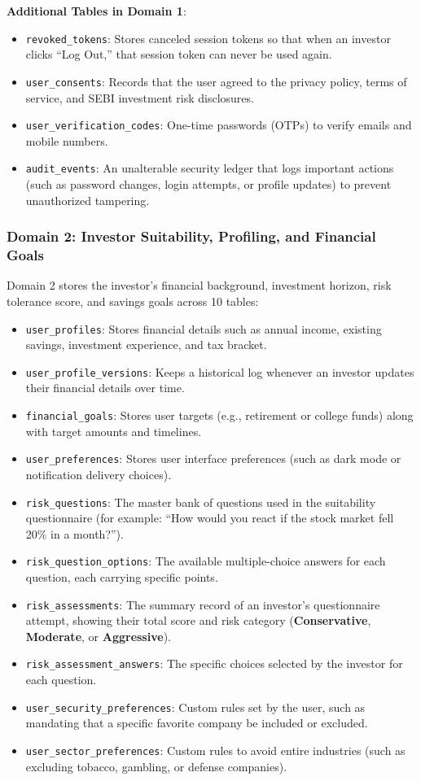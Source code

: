 \noindent \textbf{Additional Tables in Domain 1}:
\begin{itemize}
    \item \texttt{revoked\_tokens}: Stores canceled session tokens so that when an investor clicks ``Log Out,'' that session token can never be used again.
    \item \texttt{user\_consents}: Records that the user agreed to the privacy policy, terms of service, and SEBI investment risk disclosures.
    \item \texttt{user\_verification\_codes}: One-time passwords (OTPs) to verify emails and mobile numbers.
    \item \texttt{audit\_events}: An unalterable security ledger that logs important actions (such as password changes, login attempts, or profile updates) to prevent unauthorized tampering.
\end{itemize}

\clearpage
\subsubsection{Domain 2: Investor Suitability, Profiling, and Financial Goals}
Domain 2 stores the investor's financial background, investment horizon, risk tolerance score, and savings goals across 10 tables:
\begin{itemize}
    \item \texttt{user\_profiles}: Stores financial details such as annual income, existing savings, investment experience, and tax bracket.
    \item \texttt{user\_profile\_versions}: Keeps a historical log whenever an investor updates their financial details over time.
    \item \texttt{financial\_goals}: Stores user targets (e.g., retirement or college funds) along with target amounts and timelines.
    \item \texttt{user\_preferences}: Stores user interface preferences (such as dark mode or notification delivery choices).
    \item \texttt{risk\_questions}: The master bank of questions used in the suitability questionnaire (for example: ``How would you react if the stock market fell 20\% in a month?'').
    \item \texttt{risk\_question\_options}: The available multiple-choice answers for each question, each carrying specific points.
    \item \texttt{risk\_assessments}: The summary record of an investor's questionnaire attempt, showing their total score and risk category (\textbf{Conservative}, \textbf{Moderate}, or \textbf{Aggressive}).
    \item \texttt{risk\_assessment\_answers}: The specific choices selected by the investor for each question.
    \item \texttt{user\_security\_preferences}: Custom rules set by the user, such as mandating that a specific favorite company be included or excluded.
    \item \texttt{user\_sector\_preferences}: Custom rules to avoid entire industries (such as excluding tobacco, gambling, or defense companies).
\end{itemize}

